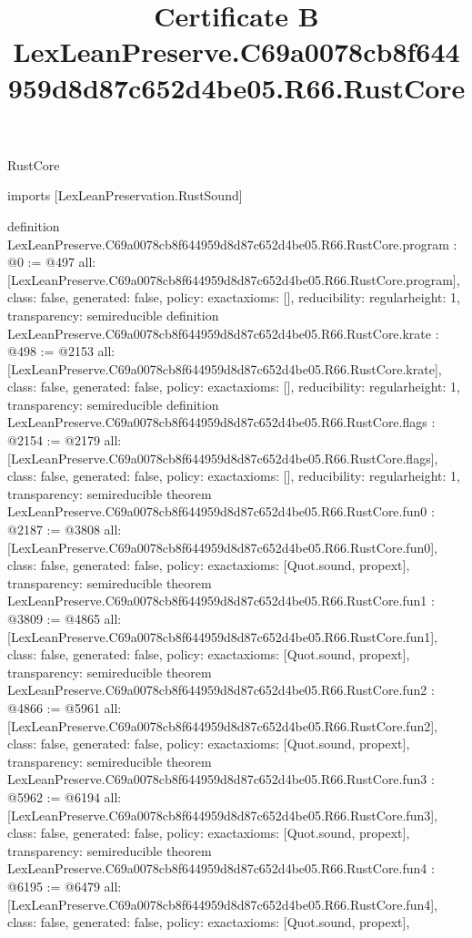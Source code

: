 \begin{lexlean}{RustCore}
\title{Certificate B LexLeanPreserve.C69a0078cb8f644959d8d87c652d4be05.R66.RustCore}
\begin{coremodule}
imports [LexLeanPreservation.RustSound]

definition LexLeanPreserve.C69a0078cb8f644959d8d87c652d4be05.R66.RustCore.program : @0 := @497 {
  all: [LexLeanPreserve.C69a0078cb8f644959d8d87c652d4be05.R66.RustCore.program],
  class: false,
  generated: false,
  policy: exact{axioms: []},
  reducibility: regular{height: 1},
  transparency: semireducible
}
definition LexLeanPreserve.C69a0078cb8f644959d8d87c652d4be05.R66.RustCore.krate : @498 := @2153 {
  all: [LexLeanPreserve.C69a0078cb8f644959d8d87c652d4be05.R66.RustCore.krate],
  class: false,
  generated: false,
  policy: exact{axioms: []},
  reducibility: regular{height: 1},
  transparency: semireducible
}
definition LexLeanPreserve.C69a0078cb8f644959d8d87c652d4be05.R66.RustCore.flags : @2154 := @2179 {
  all: [LexLeanPreserve.C69a0078cb8f644959d8d87c652d4be05.R66.RustCore.flags],
  class: false,
  generated: false,
  policy: exact{axioms: []},
  reducibility: regular{height: 1},
  transparency: semireducible
}
theorem LexLeanPreserve.C69a0078cb8f644959d8d87c652d4be05.R66.RustCore.fun0 : @2187 := @3808 {
  all: [LexLeanPreserve.C69a0078cb8f644959d8d87c652d4be05.R66.RustCore.fun0],
  class: false,
  generated: false,
  policy: exact{axioms: [Quot.sound, propext]},
  transparency: semireducible
}
theorem LexLeanPreserve.C69a0078cb8f644959d8d87c652d4be05.R66.RustCore.fun1 : @3809 := @4865 {
  all: [LexLeanPreserve.C69a0078cb8f644959d8d87c652d4be05.R66.RustCore.fun1],
  class: false,
  generated: false,
  policy: exact{axioms: [Quot.sound, propext]},
  transparency: semireducible
}
theorem LexLeanPreserve.C69a0078cb8f644959d8d87c652d4be05.R66.RustCore.fun2 : @4866 := @5961 {
  all: [LexLeanPreserve.C69a0078cb8f644959d8d87c652d4be05.R66.RustCore.fun2],
  class: false,
  generated: false,
  policy: exact{axioms: [Quot.sound, propext]},
  transparency: semireducible
}
theorem LexLeanPreserve.C69a0078cb8f644959d8d87c652d4be05.R66.RustCore.fun3 : @5962 := @6194 {
  all: [LexLeanPreserve.C69a0078cb8f644959d8d87c652d4be05.R66.RustCore.fun3],
  class: false,
  generated: false,
  policy: exact{axioms: [Quot.sound, propext]},
  transparency: semireducible
}
theorem LexLeanPreserve.C69a0078cb8f644959d8d87c652d4be05.R66.RustCore.fun4 : @6195 := @6479 {
  all: [LexLeanPreserve.C69a0078cb8f644959d8d87c652d4be05.R66.RustCore.fun4],
  class: false,
  generated: false,
  policy: exact{axioms: [Quot.sound, propext]},
}
\end{coremodule}
\end{lexlean}
